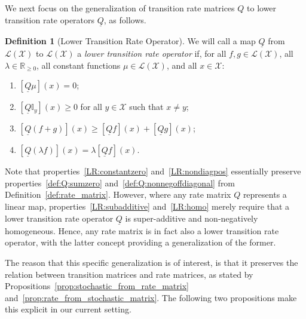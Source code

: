 \documentclass[10pt,a4paper]{paper}
\theoremstyle{definition}
\newtheorem{proposition}[theorem]{Proposition}
\newtheorem{definition}{Definition}
\newcommand{\reals}{\mathbb{R}}
\newcommand{\realsnonneg}{\reals_{\geq 0}}
\newcommand{\states}{\mathcal{X}}
\newcommand{\lt}{\underline{T}}
\newcommand{\gambles}{\mathcal{L}}
\newcommand{\gamblesX}{\gambles(\states)}
\newcommand{\ind}[1]{\mathbb{I}_{#1}}
\newcommand{\lrate}{\underline{Q}}
\newcommand{\norm}[1]{\left\lVert #1 \right\rVert}
\begin{document}
We next focus on the generalization of transition rate matrices $Q$ to lower transition rate operators $\lrate$, as follows.
\begin{definition}[Lower Transition Rate Operator]\label{def:coh_low_trans_rate}
We will call a map $\lrate$ from $\gamblesX$ to $\gamblesX$ a \emph{lower transition rate operator} if, for all $f,g\in\gamblesX$, all $\lambda\in\realsnonneg$, all constant functions $\mu\in\gamblesX$, and all $x\in\states$:

\begin{enumerate}[label=LR\arabic*:,ref=LR\arabic*]
\item\label{LR:constantzero}
$\left[\lrate\mu\right](x)=0$;
\item\label{LR:nondiagpos}
$\left[\lrate\ind{y}\right](x)\geq0$ for all $y\in\states$ such that $x\neq y$;
\item\label{LR:subadditive}
$\left[\lrate(f+g)\right](x)\geq\left[\lrate f\right](x)+\left[\lrate g\right](x)$;
\item\label{LR:homo}
$\left[\lrate(\lambda f)\right](x)= \lambda\left[\lrate f\right](x)$.
\end{enumerate}
\end{definition}

Note that properties~\ref{LR:constantzero} and~\ref{LR:nondiagpos} essentially preserve properties~\ref{def:Q:sumzero} and~\ref{def:Q:nonnegoffdiagonal} from Definition~\ref{def:rate_matrix}. However, where any rate matrix $Q$ represents a linear map, properties~\ref{LR:subadditive} and~\ref{LR:homo} merely require that a lower transition rate operator $\lrate$ is super-additive and non-negatively homogeneous. Hence, any rate matrix is in fact also a lower transition rate operator, with the latter concept providing a generalization of the former.

%
The reason that this specific generalization is of interest, is that it preserves the relation between transition matrices and rate matrices, as stated by Propositions~\ref{prop:stochastic_from_rate_matrix} and~\ref{prop:rate_from_stochastic_matrix}. The following two propositions make this explicit in our current setting.
\end{document}
